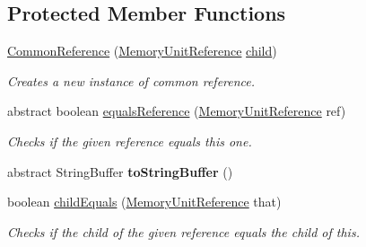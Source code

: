 \subsection*{Protected Member Functions}
\begin{DoxyCompactItemize}
\item 
\hyperlink{classedu_1_1udel_1_1cis_1_1vsl_1_1civl_1_1model_1_1common_1_1expression_1_1reference_1_1CommonReference_a3938665b8e6b639a9de1ed1779d12822}{Common\+Reference} (\hyperlink{interfaceedu_1_1udel_1_1cis_1_1vsl_1_1civl_1_1model_1_1IF_1_1expression_1_1reference_1_1MemoryUnitReference}{Memory\+Unit\+Reference} \hyperlink{classedu_1_1udel_1_1cis_1_1vsl_1_1civl_1_1model_1_1common_1_1expression_1_1reference_1_1CommonReference_a32b580fa84654a7581644054dd9a7fa7}{child})
\begin{DoxyCompactList}\small\item\em Creates a new instance of common reference. \end{DoxyCompactList}\item 
abstract boolean \hyperlink{classedu_1_1udel_1_1cis_1_1vsl_1_1civl_1_1model_1_1common_1_1expression_1_1reference_1_1CommonReference_a11a4a8416154b84c9d1395ba2d931cd7}{equals\+Reference} (\hyperlink{interfaceedu_1_1udel_1_1cis_1_1vsl_1_1civl_1_1model_1_1IF_1_1expression_1_1reference_1_1MemoryUnitReference}{Memory\+Unit\+Reference} ref)
\begin{DoxyCompactList}\small\item\em Checks if the given reference equals this one. \end{DoxyCompactList}\item 
\hypertarget{classedu_1_1udel_1_1cis_1_1vsl_1_1civl_1_1model_1_1common_1_1expression_1_1reference_1_1CommonReference_ab5a81554f9a3d3ab1c017875cc9263b0}{}abstract String\+Buffer {\bfseries to\+String\+Buffer} ()\label{classedu_1_1udel_1_1cis_1_1vsl_1_1civl_1_1model_1_1common_1_1expression_1_1reference_1_1CommonReference_ab5a81554f9a3d3ab1c017875cc9263b0}

\item 
boolean \hyperlink{classedu_1_1udel_1_1cis_1_1vsl_1_1civl_1_1model_1_1common_1_1expression_1_1reference_1_1CommonReference_a0fbe5ecc7eecb53b24a2dcde7ba00d00}{child\+Equals} (\hyperlink{interfaceedu_1_1udel_1_1cis_1_1vsl_1_1civl_1_1model_1_1IF_1_1expression_1_1reference_1_1MemoryUnitReference}{Memory\+Unit\+Reference} that)
\begin{DoxyCompactList}\small\item\em Checks if the child of the given reference equals the child of this. \end{DoxyCompactList}\end{DoxyCompactItemize}
